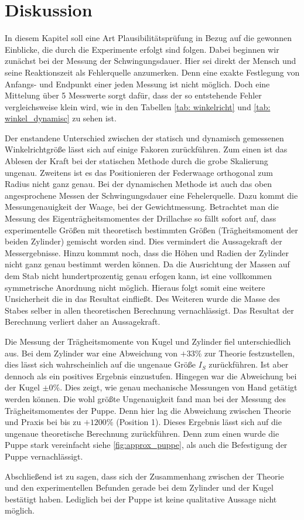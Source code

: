 \section{Diskussion}
In diesem Kapitel soll eine Art Plausibilitätsprüfung in Bezug auf die
gewonnen Einblicke, die durch die Experimente erfolgt sind folgen.
Dabei beginnen wir zunächst bei der Messung der Schwingungsdauer.
Hier sei direkt der Mensch und seine Reaktionszeit als Fehlerquelle anzumerken.
Denn eine exakte Festlegung von Anfangs- und Endpunkt einer jeden Messung ist
nicht möglich. %
Doch eine Mittelung
über 5 Messwerte sorgt dafür, dass der so entstehende Fehler vergleichsweise klein wird, wie in den Tabellen
\ref{tab: winkelricht} und \ref{tab: winkel_dynamisc} zu sehen ist.

Der enstandene Unterschied zwischen der statisch und dynamisch gemessenen Winkelrichtgröße
lässt sich auf einige Fakoren zurückführen.
Zum einen ist das Ablesen der Kraft bei der statischen Methode
durch die grobe Skalierung ungenau.
Zweitens ist es das Positionieren der Federwaage orthogonal zum Radius
nicht ganz genau.
Bei der dynamischen Methode ist auch das oben angesprochene Messen der Schwingungsdauer
eine Fehelerquelle.
Dazu kommt die Messungenauigkeit der Waage, bei der Gewichtmessung.
Betrachtet man die Messung des Eigenträgheitsmomentes der Drillachse so fällt sofort auf,
dass experimentelle Größen mit theoretisch bestimmten Größen (Trägheitsmoment der beiden Zylinder)
gemischt worden sind.
Dies vermindert die Aussagekraft der Messergebnisse.
Hinzu kommmt noch, dass die  Höhen und Radien der Zylinder nicht ganz genau bestimmt werden können.
Da die Ausrichtung der Massen auf dem Stab nicht hundertprozentig genau erfogen kann, ist
eine vollkommen symmetrische Anordnung nicht möglich.
Hieraus folgt somit eine weitere Unsicherheit die in das Resultat einfließt.
Des Weiteren wurde die Masse des Stabes selber in allen theoretischen Berechnung vernachlässigt.
Das Resultat der Berechnung verliert daher an Aussagekraft.

Die Messung der Trägheitsmomente von Kugel und Zylinder fiel unterschiedlich aus.
Bei dem Zylinder war eine Abweichung von $+33\%$ zur Theorie festzustellen,
dies lässt sich wahrscheinlich auf die ungenaue Größe $I_S$ zurückführen.
Ist aber dennoch als ein positives Ergebnis einzustufen.
Hingegen war die Abweichung bei der Kugel $\pm 0\%$. Dies zeigt,
wie genau mechanische Messungen von Hand getätigt werden können.
Die wohl größte Ungenauigkeit fand man bei der Messung des Trägheitsmomentes der Puppe.
Denn hier lag die Abweichung zwischen Theorie und Praxis bei bis zu
$+1200\%$ (Position 1). Dieses Ergebnis lässt sich auf die
ungenaue theoretische Berechnung zurückführen.
Denn zum einen wurde die Puppe stark vereinfacht siehe \ref{fig:approx_puppe}, als auch
die Befestigung der Puppe vernachlässigt.  %

Abschließend ist zu sagen, dass sich der Zusammenhang zwischen der Theorie und den experimentellen Befunden
gerade bei dem Zylinder und der Kugel bestätigt haben.
Lediglich bei der Puppe ist keine qualitative Aussage nicht möglich.
